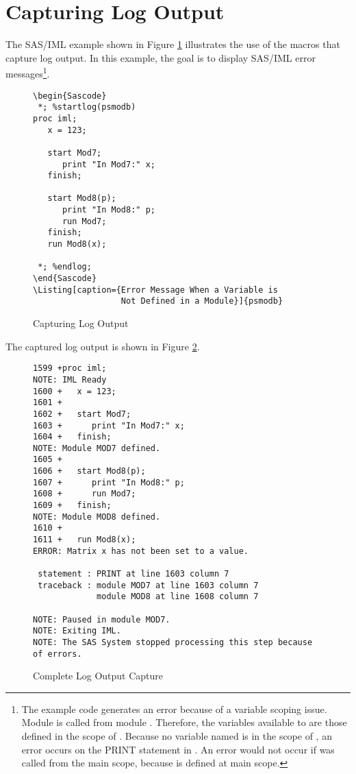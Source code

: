 \documentclass[article,oneside]{memoir}
\begin{document}
\section{Capturing Log Output}
    
  The SAS/IML example shown in Figure \ref{logout} illustrates 
  the use of the macros that capture log output. In this example, the goal is to 
  display SAS/IML error messages\footnote{The example code generates an error because 
  of a variable scoping issue.
  Module  is called from module . Therefore, the variables 
  available to  are those defined in the scope of .  
  Because no variable named  is in the  scope of , 
  an error occurs on the PRINT statement in . 
  An error would not occur if  was called from the main scope, 
  because  is defined at main scope.}.

\begin{figure}[H]
\begin{snugshade}
\begin{verbatim}
\begin{Sascode}
 *; %startlog(psmodb)
proc iml;
   x = 123;
   
   start Mod7;
      print "In Mod7:" x;
   finish;

   start Mod8(p);
      print "In Mod8:" p;
      run Mod7;
   finish;
   run Mod8(x);
   
 *; %endlog;
\end{Sascode}
\Listing[caption={Error Message When a Variable is 
                  Not Defined in a Module}]{psmodb}
\end{verbatim}
\end{snugshade}
\caption{Capturing Log Output}\label{logout}
\end{figure}

  The captured log output is shown in Figure \ref{logcomplete}.
  

\begin{figure}[H]
\begin{snugshade}
\begin{verbatim}
1599 +proc iml;
NOTE: IML Ready
1600 +   x = 123;
1601 +
1602 +   start Mod7;
1603 +      print "In Mod7:" x;
1604 +   finish;
NOTE: Module MOD7 defined.
1605 +
1606 +   start Mod8(p);
1607 +      print "In Mod8:" p;
1608 +      run Mod7;
1609 +   finish;
NOTE: Module MOD8 defined.
1610 +
1611 +   run Mod8(x);
ERROR: Matrix x has not been set to a value.

 statement : PRINT at line 1603 column 7
 traceback : module MOD7 at line 1603 column 7
             module MOD8 at line 1608 column 7

NOTE: Paused in module MOD7.
NOTE: Exiting IML.
NOTE: The SAS System stopped processing this step because of errors.
\end{verbatim}
\end{snugshade}
\caption{Complete Log Output Capture}\label{logcomplete}
\end{figure}
\end{document}
